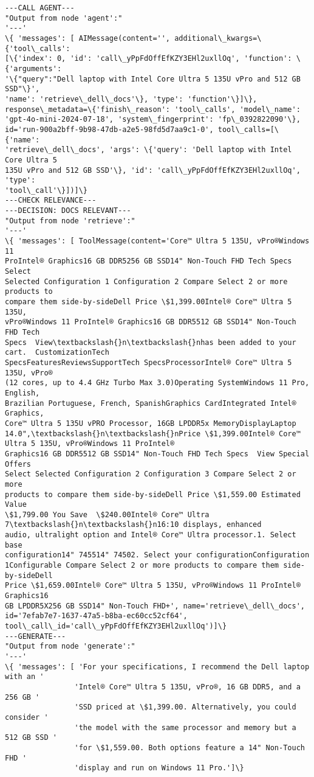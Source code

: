 \documentclass[11pt]{article}
\begin{document}
    \begin{Verbatim}[commandchars=\\\{\}]
---CALL AGENT---
"Output from node 'agent':"
'---'
\{ 'messages': [ AIMessage(content='', additional\_kwargs=\{'tool\_calls':
[\{'index': 0, 'id': 'call\_yPpFdOffEfKZY3EHl2uxllOq', 'function': \{'arguments':
'\{"query":"Dell laptop with Intel Core Ultra 5 135U vPro and 512 GB SSD"\}',
'name': 'retrieve\_dell\_docs'\}, 'type': 'function'\}]\},
response\_metadata=\{'finish\_reason': 'tool\_calls', 'model\_name':
'gpt-4o-mini-2024-07-18', 'system\_fingerprint': 'fp\_0392822090'\},
id='run-900a2bff-9b98-47db-a2e5-98fd5d7aa9c1-0', tool\_calls=[\{'name':
'retrieve\_dell\_docs', 'args': \{'query': 'Dell laptop with Intel Core Ultra 5
135U vPro and 512 GB SSD'\}, 'id': 'call\_yPpFdOffEfKZY3EHl2uxllOq', 'type':
'tool\_call'\}])]\}
---CHECK RELEVANCE---
---DECISION: DOCS RELEVANT---
"Output from node 'retrieve':"
'---'
\{ 'messages': [ ToolMessage(content='Core™ Ultra 5 135U, vPro®Windows 11
ProIntel® Graphics16 GB DDR5256 GB SSD14" Non-Touch FHD Tech Specs  Select
Selected Configuration 1 Configuration 2 Compare Select 2 or more products to
compare them side-by-sideDell Price \$1,399.00Intel® Core™ Ultra 5 135U,
vPro®Windows 11 ProIntel® Graphics16 GB DDR5512 GB SSD14" Non-Touch FHD Tech
Specs  View\textbackslash{}n\textbackslash{}nhas been added to your cart.  CustomizationTech
SpecsFeaturesReviewsSupportTech SpecsProcessorIntel® Core™ Ultra 5 135U, vPro®
(12 cores, up to 4.4 GHz Turbo Max 3.0)Operating SystemWindows 11 Pro, English,
Brazilian Portuguese, French, SpanishGraphics CardIntegrated Intel® Graphics,
Core™ Ultra 5 135U vPRO Processor, 16GB LPDDR5x MemoryDisplayLaptop
14.0",\textbackslash{}n\textbackslash{}nPrice \$1,399.00Intel® Core™ Ultra 5 135U, vPro®Windows 11 ProIntel®
Graphics16 GB DDR5512 GB SSD14" Non-Touch FHD Tech Specs  View Special Offers
Select Selected Configuration 2 Configuration 3 Compare Select 2 or more
products to compare them side-by-sideDell Price \$1,559.00 Estimated Value
\$1,799.00 You Save  \$240.00Intel® Core™ Ultra 7\textbackslash{}n\textbackslash{}n16:10 displays, enhanced
audio, ultralight option and Intel® Core™ Ultra processor.1. Select base
configuration14" 745514" 74502. Select your configurationConfiguration
1Configurable Compare Select 2 or more products to compare them side-by-sideDell
Price \$1,659.00Intel® Core™ Ultra 5 135U, vPro®Windows 11 ProIntel® Graphics16
GB LPDDR5X256 GB SSD14" Non-Touch FHD+', name='retrieve\_dell\_docs',
id='7efab7e7-1637-47a5-b8ba-ec60cc52cf64',
tool\_call\_id='call\_yPpFdOffEfKZY3EHl2uxllOq')]\}
---GENERATE---
"Output from node 'generate':"
'---'
\{ 'messages': [ 'For your specifications, I recommend the Dell laptop with an '
                'Intel® Core™ Ultra 5 135U, vPro®, 16 GB DDR5, and a 256 GB '
                'SSD priced at \$1,399.00. Alternatively, you could consider '
                'the model with the same processor and memory but a 512 GB SSD '
                'for \$1,559.00. Both options feature a 14" Non-Touch FHD '
                'display and run on Windows 11 Pro.']\}
    \end{Verbatim}
\end{document}
